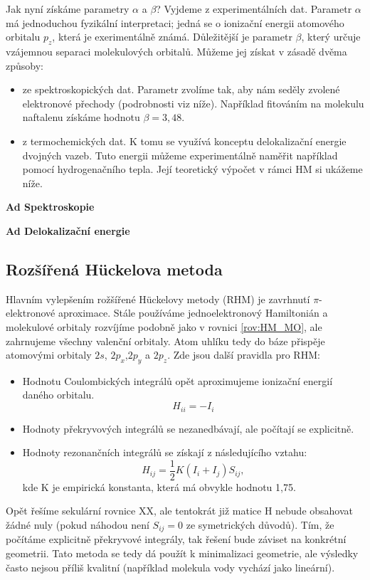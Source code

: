 Jak nyní získáme parametry $\alpha$ a $\beta$? Vyjdeme z experimentálních dat. Parametr $\alpha$ má jednoduchou fyzikální interpretaci; jedná se o ionizační energii atomového orbitalu $p_z$, která je exerimentálně známá. Důležitější je parametr $\beta$, který určuje vzájemnou separaci molekulových orbitalů. Můžeme jej získat v zásadě dvěma způsoby:
\begin{itemize}
\item ze spektroskopických dat. Parametr zvolíme tak, aby nám seděly zvolené elektronové přechody (podrobnosti viz níže). Například fitováním na molekulu naftalenu získáme hodnotu $\beta=3,48$.
\item z termochemických dat. K tomu se využívá konceptu delokalizační energie dvojných vazeb. Tuto energii můžeme experimentálně naměřit například pomocí hydrogenačního tepla. Její teoretický výpočet v rámci HM si ukážeme níže. 
\end{itemize}

\textbf{Ad Spektroskopie}

\textbf{Ad Delokalizační energie}

\subsection{Rozšířená H\"{u}ckelova metoda}

Hlavním vylepšením rožšířené H\"{u}ckelovy metody (RHM) je zavrhnutí $\pi$-elektronové aproximace.
Stále používáme jednoelektronový Hamiltonián a molekulové orbitaly rozvíjíme podobně jako v rovnici \ref{rov:HM_MO}, ale zahrnujeme všechny valenční orbitaly. Atom uhlíku tedy do báze přispěje atomovými orbitaly $2s$, $2p_x$,$2p_y$ a $2p_z$. 
Zde jsou další pravidla pro RHM:

\begin{itemize}
\item Hodnotu Coulombických integrálů opět aproximujeme ionizační energií daného orbitalu.
$$H_{ii}=-I_i$$
\item Hodnoty překryvových integrálů se nezanedbávají, ale počítají se explicitně.
\item Hodnoty rezonančních integrálů se získají z následujícího vztahu:
\begin{equation}
H_{ij}=\frac{1}{2}K(I_i+I_j)S_{ij},
\end{equation}
kde K je empirická konstanta, která má obvykle hodnotu 1,75.
\end{itemize}
Opět řešíme sekulární rovnice XX, ale tentokrát již matice H nebude obsahovat žádné nuly (pokud náhodou není $S_{ij}=0$ ze symetrických důvodů). Tím, že počítáme explicitně překryvové integrály, tak řešení bude záviset na konkrétní geometrii. Tato metoda se tedy dá použít k minimalizaci geometrie, ale výsledky často nejsou příliš kvalitní (například molekula vody vychází jako lineární).  

